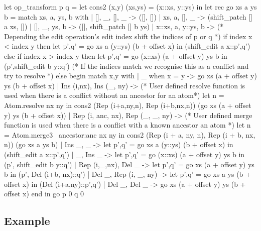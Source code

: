 \documentclass{article}
\begin{document}
\begin{longlisting}
let op_transform p q =
  let cons2 (x,y) (xs,ys) = (x::xs, y::ys) in
  let rec go xs a ys b =
    match xs, a, ys, b with
    | [], _, [], _ -> ([], [])
    | xs, a, [], _ -> (shift_patch [] a xs, [])
    | [], _, ys, b -> ([], shift_patch [] b ys)
    | x::xs, a, y::ys, b ->
      (* Depending the edit operation's edit index shift the indices of p or q *)
      if index x < index y then
        let p',q' = go xs a (y::ys) (b + offset x) in
        (shift_edit a x::p',q')
      else if index x > index y then
        let p',q' = go (x::xs) (a + offset y) ys b in
        (p',shift_edit b y::q')
      (* If the indices match we recognise this as a conflict and try to resolve *)
      else begin
        match x,y with
        | _ when x = y -> go xs (a + offset y) ys (b + offset x)
        | Ins (i,nx), Ins (_, ny) ->
          (* User defined resolve function is used 
             when there is a conflict without an ancestor for an atom*)
          let n = Atom.resolve nx ny in
          cons2 (Rep (i+a,ny,n), Rep (i+b,nx,n)) (go xs (a + offset y) ys (b + offset x))
        | Rep (i, anc, nx), Rep (_, _, ny) ->
          (* User defined merge function is used 
             when there is a conflict with a known ancestor an atom *)
          let n = Atom.merge3 ~ancestor:anc nx ny in
          cons2 (Rep (i + a, ny, n), Rep (i + b, nx, n)) (go xs a ys b)
        | Ins _, _ ->
          let p',q' = go xs a (y::ys) (b + offset x) in
          (shift_edit a x::p',q')
        | _, Ins _ ->
          let p',q' = go (x::xs) (a + offset y) ys b in
          (p', shift_edit b y::q')
        | Rep (i,_,nx), Del _ ->
          let p',q' = go xs (a + offset y) ys b in
          (p', Del (i+b, nx)::q')
        | Del _, Rep (i, _, ny) ->
          let p',q' = go xs a ys (b + offset x) in
          (Del (i+a,ny)::p',q')
        | Del _, Del _ -> go xs (a + offset y) ys (b + offset x)
      end
  in
  go p 0 q 0
\end{longlisting}

\subsection{Example}\label{vector-example}
\end{document}
